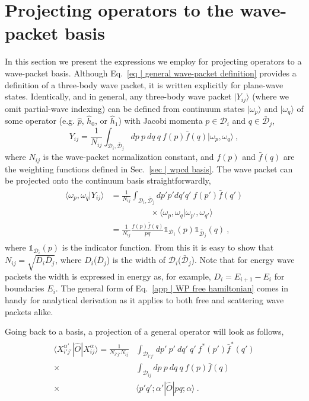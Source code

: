 \documentclass[aps,prc,showpacs,twocolumn,floatfix,nobibnotes,nofootinbib,amsmath,amssymb,longbibliography]{revtex4-2}
\begin{document}
\section{Projecting operators to the wave-packet basis}
\label{app | WP projection}
In this section we present the expressions we employ for projecting
operators to a wave-packet basis. Although Eq.~\eqref{eq | general
  wave-packet definition} provides a definition of a three-body wave
packet, it is written explicitly for plane-wave states. Identically,
and in general, any three-body wave packet $|Y_{ij}\rangle$ (where we
omit partial-wave indexing) can be defined from continuum states
$|\omega_p\rangle$ and $|\omega_q\rangle$ of some operator
(e.g. $\hat{p}$, $\hat{h}_0$, or $\hat{h}_1$) with Jacobi momenta
$p\in\mathcal{D}_i$ and $q\in\bar{\mathcal{D}}_j$, 
\begin{equation}
	Y_{ij} = \frac{1}{N_{ij}}\int_{\mathcal{D}_i,\bar{\mathcal{D}}_j} dp\:p\:dq\:q\: f(p)\bar{f}(q)|\omega_{p},\omega_{q}\rangle \:,
\end{equation}
where $N_{ij}$ is the wave-packet normalization constant, and $f(p)$ and
$\bar{f}(q)$ are the weighting functions defined in Sec.~\ref{sec | wpcd basis}.
The wave packet can be
projected onto the continuum basis straightforwardly,
\begin{align}
	\begin{split}
	\langle \omega_p,\omega_q|Y_{ij}\rangle &= \frac{1}{N_{ij}}\int_{\mathcal{D}_i,\bar{\mathcal{D}}_j} dp'p'dq'q'\: f(p')\bar{f}(q')\\
	&\hspace{2cm}\times \langle\omega_p,\omega_q|\omega_{p'},\omega_{q'}\rangle \\
	&= \frac{1}{N_{ij}}\frac{f(p)\bar{f}(q)}{pq}\mathds{1}_{\mathcal{D}_i}(p)\mathds{1}_{\bar{\mathcal{D}}_j}(q) \:,
	\end{split}
	\label{eq | continuum-WP inner product}
\end{align}
where $\mathds{1}_{\mathcal{D}_i}(p)$ is the indicator function. From this
it is easy to show that $N_{ij}=\sqrt{D_i\bar{D}_j}$, where
$D_i$($\bar{D}_j$) is the width of
$\mathcal{D}_i$($\bar{\mathcal{D}}_j$). Note that for energy wave packets the
width is expressed in energy as, for example, $D_i=E_{i+1}-E_i$ for boundaries $E_i$.
The general form of Eq.~\eqref{app | WP free hamiltonian} comes in
handy for analytical derivation as it applies to both free and
scattering wave packets alike.

Going back to a \fwp{} basis, a projection of a general \NNN{} operator will
look as follows,
\begin{align}
	\begin{split}
	\langle X_{i'j'}^{\alpha'}|\hat{O}|X_{ij}^\alpha\rangle = \frac{1}{N_{i'j'}N_{ij}}&\int_{\mathcal{D}_{i'j'}} dp'\:p'\:dq'\:q' \:f^*(p')\bar{f}^*(q')\\
	\times&\int_{\mathcal{D}_{ij}} dp\:p\:dq\:q\: f(p)\bar{f}(q)\\
	\times &\langle p'q';\alpha'|\hat{O}|pq;\alpha\rangle \:.
	\end{split}
\label{eq | general operator in fWP basis}
\end{align}
\end{document}

